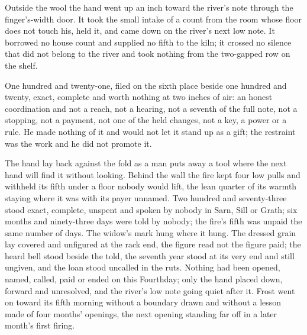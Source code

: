 Outside the wool the hand went up an inch toward the river's note through the finger's-width door. It took the small intake of a count from the room whose floor does not touch his, held it, and came down on the river's next low note. It borrowed no house count and supplied no fifth to the kiln; it crossed no silence that did not belong to the river and took nothing from the two-gapped row on the shelf.

One hundred and twenty-one, filed on the sixth place beside one hundred and twenty, exact, complete and worth nothing at two inches of air: an honest coordination and not a reach, not a hearing, not a seventh of the full note, not a stopping, not a payment, not one of the held changes, not a key, a power or a rule. He made nothing of it and would not let it stand up as a gift; the restraint was the work and he did not promote it.

The hand lay back against the fold as a man puts away a tool where the next hand will find it without looking. Behind the wall the fire kept four low pulls and withheld its fifth under a floor nobody would lift, the lean quarter of its warmth staying where it was with its payer unnamed. Two hundred and seventy-three stood exact, complete, unspent and spoken by nobody in Sarn, Sill or Grath; six months and ninety-three days were told by nobody; the fire's fifth was unpaid the same number of days. The widow's mark hung where it hung. The dressed grain lay covered and unfigured at the rack end, the figure read not the figure paid; the heard bell stood beside the told, the seventh year stood at its very end and still ungiven, and the loan stood uncalled in the ruts. Nothing had been opened, named, called, paid or ended on this Fourthday; only the hand placed down, forward and unresolved, and the river's low note going quiet after it. Frost went on toward its fifth morning without a boundary drawn and without a lesson made of four months' openings, the next opening standing far off in a later month's first firing.

